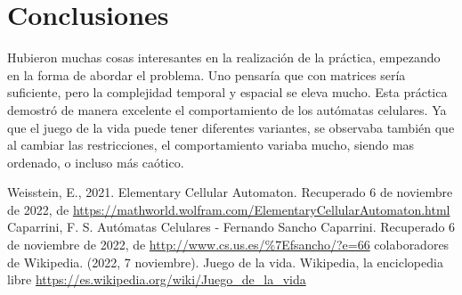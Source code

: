 \documentclass[10pt]{article}
\begin{document}
    \section{Conclusiones}
    Hubieron muchas cosas interesantes en la realización de la práctica, empezando en la forma de abordar el problema. Uno pensaría que con matrices sería suficiente, pero la complejidad temporal y espacial se eleva mucho. Esta práctica demostró de manera excelente el comportamiento de los autómatas celulares. Ya que el juego de la vida puede tener diferentes variantes, se observaba también que al cambiar las restricciones, el comportamiento variaba mucho, siendo mas ordenado, o incluso más caótico. 
    
    \begin{thebibliography}{1}
        Weisstein, E., 2021. Elementary Cellular Automaton. Recuperado 6 de noviembre de 2022, de \url{https://mathworld.wolfram.com/ElementaryCellularAutomaton.html}
         Caparrini, F. S. Autómatas Celulares - Fernando Sancho Caparrini. Recuperado 6 de noviembre de 2022, de \url{http://www.cs.us.es/%7Efsancho/?e=66}
         colaboradores de Wikipedia. (2022, 7 noviembre). Juego de la vida. Wikipedia, la enciclopedia libre \url{https://es.wikipedia.org/wiki/Juego_de_la_vida}
    \end{thebibliography}
    
\end{document}
